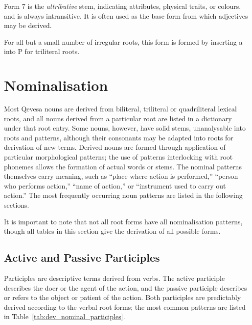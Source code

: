 \documentclass[grammar]{subfiles}
\begin{document}
  Form 7 is the \emph{attributive} stem, indicating attributes, physical traits, or colours, and is always intransitive. 
  It is often used as the base form from which adjectives may be derived.

  For all but a small number of irregular roots, this form is formed by inserting a  into P for triliteral roots. %

%

  \section{Nominalisation}
  \label{sec:dev_nominalisation}

  Most Qevesa nouns are derived from biliteral, triliteral or quadriliteral lexical roots, and all nouns derived from a particular root are listed in a dictionary under that root entry. 
  Some nouns, however, have solid stems, unanalysable into roots and patterns, although their consonants may be adapted into roots for derivation of new terms. 
  Derived nouns are formed through application of particular morphological patterns; the use of patterns interlocking with root phonemes allows the formation of actual words or stems. 
  The nominal patterns themselves carry meaning, such as “place where action is performed,” “person who performs action,” “name of action,” or “instrument used to carry out action.” 
  The most frequently occurring noun patterns are listed in the following sections.

  It is important to note that not all root forms have all nominalisation patterns, though all tables in this section give the derivation of all possible forms. 

  \subsection{Active and Passive Participles}
  \label{ssec:dev_active_passive_participles}

  Participles are descriptive terms derived from verbs. 
  The active participle describes the doer or the agent of the action, and the passive participle describes or refers to the object or patient of the action. 
  Both participles are predictably derived according to the verbal root forms; the most common patterns are listed in Table~\ref{tab:dev_nominal_participles}.
\end{document}
